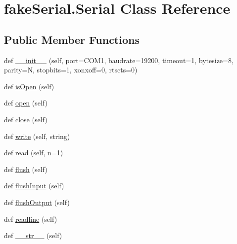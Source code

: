 \hypertarget{classfake_serial_1_1_serial}{}\section{fake\+Serial.\+Serial Class Reference}
\label{classfake_serial_1_1_serial}
\subsection*{Public Member Functions}
\begin{DoxyCompactItemize}
\item 
def \mbox{\hyperlink{classfake_serial_1_1_serial_abcf3b27b5edb193420574f383ff1603c}{\+\_\+\+\_\+init\+\_\+\+\_\+}} (self, port=\textquotesingle{}C\+O\+M1\textquotesingle{}, baudrate=19200, timeout=1, bytesize=8, parity=\textquotesingle{}N\textquotesingle{}, stopbits=1, xonxoff=0, rtscts=0)
\item 
def \mbox{\hyperlink{classfake_serial_1_1_serial_a69cc2297e7c5bfb87de4df789774f3a2}{is\+Open}} (self)
\item 
def \mbox{\hyperlink{classfake_serial_1_1_serial_a2e4137a108e41f23e49735667d9b4c05}{open}} (self)
\item 
def \mbox{\hyperlink{classfake_serial_1_1_serial_a183f0034571d103c4c90c041e6643557}{close}} (self)
\item 
def \mbox{\hyperlink{classfake_serial_1_1_serial_abc4ef915d782f9e4a8d1d6f398298a6d}{write}} (self, string)
\item 
def \mbox{\hyperlink{classfake_serial_1_1_serial_a46f1021e19572ff944e886e53a51a1d1}{read}} (self, n=1)
\item 
def \mbox{\hyperlink{classfake_serial_1_1_serial_a3c34cb0659b6d0dd5924ac79d79ad6bf}{flush}} (self)
\item 
def \mbox{\hyperlink{classfake_serial_1_1_serial_a6abb75597f64f245df8e0c7f62c7fde5}{flush\+Input}} (self)
\item 
def \mbox{\hyperlink{classfake_serial_1_1_serial_afecff2730c11a9a8e7f687c57a2c738a}{flush\+Output}} (self)
\item 
def \mbox{\hyperlink{classfake_serial_1_1_serial_a58f35303f074c25e972c0b16c6382bf4}{readline}} (self)
\item 
def \mbox{\hyperlink{classfake_serial_1_1_serial_a597b04385c851077ccc3363f4bfb32c1}{\+\_\+\+\_\+str\+\_\+\+\_\+}} (self)
\end{DoxyCompactItemize}
